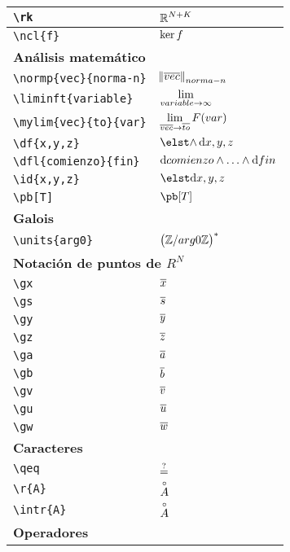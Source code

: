 \begin{longtable}{|p{3.5cm}|p{2cm}|}
\verb|\rk| & $\displaystyle\mathbb{R}^{N+K}$ \\ \midrule 
\verb|\ncl{f}| & $\displaystyle\ker f$ \\ \midrule 
\bottomrule \multicolumn{2}{|p{5.5cm}|}{\textbf{Análisis matemático}} \\ \toprule 
\verb|\normp{vec}{norma-n}| & $\displaystyle\norm{\overline{vec}}_{norma-n}$ \\ \midrule 
\verb|\liminft{variable}| & $\displaystyle\lim_{{variable}\rightarrow \infty}$ \\ \midrule 
\verb|\mylim{vec}{to}{var}| & $\displaystyle\lim_{\overline{vec} \rightarrow \overline{to}} F({var})$ \\ \midrule 
\verb|\df{x,y,z}| & $\displaystyle\df{x,y,z}$ \\ \midrule 
\verb|\dfl{comienzo}{fin}| & $\displaystyle\operatorname{d\!}{} comienzo \wedge \dotsc \wedge \operatorname{d\!}{} fin$ \\ \midrule 
\verb|\id{x,y,z}| & $\displaystyle\id{x,y,z}$ \\ \midrule 
\verb|\pb[T]| & $\displaystyle\pb[T]$ \\ \midrule 
\bottomrule \multicolumn{2}{|p{5.5cm}|}{\textbf{Galois}} \\ \toprule 
\verb|\units{arg0}| & $\displaystyle\left(\mathbb{Z}/{arg0}\mathbb{Z}\right)^*$ \\ \midrule 
\bottomrule \multicolumn{2}{|p{5.5cm}|}{\textbf{Notación de puntos de $R^N$}} \\ \toprule 
\verb|\gx| & $\displaystyle\overline{x}$ \\ \midrule 
\verb|\gs| & $\displaystyle\overline{s}$ \\ \midrule 
\verb|\gy| & $\displaystyle\overline{y}$ \\ \midrule 
\verb|\gz| & $\displaystyle\overline{z}$ \\ \midrule 
\verb|\ga| & $\displaystyle\overline{a}$ \\ \midrule 
\verb|\gb| & $\displaystyle\overline{b}$ \\ \midrule 
\verb|\gv| & $\displaystyle\overline{v}$ \\ \midrule 
\verb|\gu| & $\displaystyle\overline{u}$ \\ \midrule 
\verb|\gw| & $\displaystyle\overline{w}$ \\ \midrule 
\bottomrule \multicolumn{2}{|p{5.5cm}|}{\textbf{Caracteres}} \\ \toprule 
\verb|\qeq| & $\displaystyle\overset{?}{=}$ \\ \midrule 
\verb|\r{A}| & $\displaystyle\overset{\circ}{A}$ \\ \midrule 
\verb|\intr{A}| & $\displaystyle\overset{\circ}{A}$ \\ \midrule 
\bottomrule \multicolumn{2}{|p{5.5cm}|}{\textbf{Operadores}} \\ \toprule 

\end{longtable}
